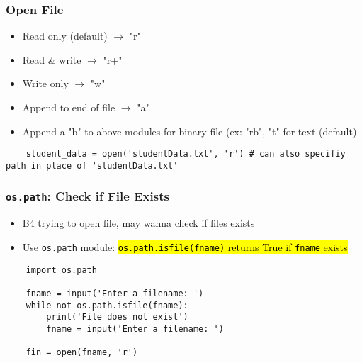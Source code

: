 \documentclass{article}
\begin{document}
\subsubsection{Open File}
    \begin{multicols}{2}
        \begin{itemize}
            \item Read only (default) $\rightarrow$ "r"
            \item Read \& write $\rightarrow$ "r+"
            \item Write only $\rightarrow$ "w"
            \item Append to end of file $\rightarrow$ "a"
            \item Append a "b" to above modules for binary file (ex: "rb", "t" for text (default)
        \end{itemize}
    \end{multicols}
\vspace{-1em}
\begin{lstlisting}
    student_data = open('studentData.txt', 'r') # can also specifiy path in place of 'studentData.txt'
\end{lstlisting}

\subsubsection{\texttt{os.path}: Check if File Exists}
    \begin{itemize}
        \item B4 trying to open file, may wanna check if files exists
        \item Use \texttt{os.path} module: \hl{\texttt{os.path.isfile(fname)} returns True if \texttt{fname} exists}
    \end{itemize}
\vspace{-1em}
\begin{lstlisting}
    import os.path
    
    fname = input('Enter a filename: ')
    while not os.path.isfile(fname):
        print('File does not exist')
        fname = input('Enter a filename: ')
    
    fin = open(fname, 'r')
\end{lstlisting}

\end{document}
